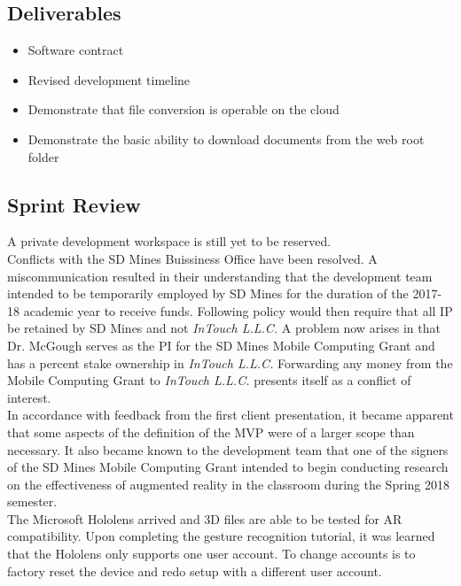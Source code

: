     \subsection{Deliverables}
    \label{sec:Sprint3_deliverables}
        \begin{itemize}
            \item Software contract
            \item Revised development timeline
            \item Demonstrate that file conversion is operable on the cloud
            \item Demonstrate the basic ability to download documents from the web root folder
        \end{itemize}

    \subsection{Sprint Review}
    \label{sec:Sprint3_review}
        \hspace{7mm}
        A private development workspace is still yet to be reserved.\\

        Conflicts with the SD Mines Buissiness Office have been resolved.  A miscommunication resulted in their
        understanding that the development team intended to be temporarily employed by SD Mines for the duration
        of the 2017-18 academic year to receive funds.  Following policy would then require that all IP be retained
        by SD Mines and not \textit{InTouch L.L.C.}  A problem now arises in that Dr. McGough serves as the PI for
        the SD Mines Mobile Computing Grant and has a percent stake ownership in \textit{InTouch L.L.C.}  Forwarding
        any money from the Mobile Computing Grant to \textit{InTouch L.L.C.} presents itself as a conflict of interest.\\
        
        In accordance with feedback from the first client presentation, it became apparent that some aspects of the 
        definition of the MVP were of a larger scope than necessary.  It also became known to the development team
        that one of the signers of the SD Mines Mobile Computing Grant intended to begin conducting research on the
        effectiveness of augmented reality in the classroom during the Spring 2018 semester.\\

        The Microsoft Hololens arrived and 3D files are able to be tested for AR compatibility.  Upon completing
        the gesture recognition tutorial, it was learned that the Hololens only supports one user account.  To
        change accounts is to factory reset the device and redo setup with a different user account.\\

